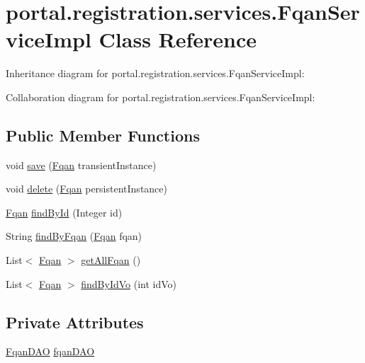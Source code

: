 \hypertarget{classportal_1_1registration_1_1services_1_1FqanServiceImpl}{
\section{portal.registration.services.FqanServiceImpl Class Reference}
\label{classportal_1_1registration_1_1services_1_1FqanServiceImpl}
}


Inheritance diagram for portal.registration.services.FqanServiceImpl:


Collaboration diagram for portal.registration.services.FqanServiceImpl:
\subsection*{Public Member Functions}
\begin{DoxyCompactItemize}
\item 
void \hyperlink{classportal_1_1registration_1_1services_1_1FqanServiceImpl_aa664ef0629c5e47dcb92136ecee98a83}{save} (\hyperlink{classportal_1_1registration_1_1domain_1_1Fqan}{Fqan} transientInstance)
\item 
void \hyperlink{classportal_1_1registration_1_1services_1_1FqanServiceImpl_a455a630259e41689cd64eb3e7d7eaaed}{delete} (\hyperlink{classportal_1_1registration_1_1domain_1_1Fqan}{Fqan} persistentInstance)
\item 
\hyperlink{classportal_1_1registration_1_1domain_1_1Fqan}{Fqan} \hyperlink{classportal_1_1registration_1_1services_1_1FqanServiceImpl_a148941aec6f375b090347c890dbf2c85}{findById} (Integer id)
\item 
String \hyperlink{classportal_1_1registration_1_1services_1_1FqanServiceImpl_a6c43b5b8e616412c1f6d3080922ab9eb}{findByFqan} (\hyperlink{classportal_1_1registration_1_1domain_1_1Fqan}{Fqan} fqan)
\item 
List$<$ \hyperlink{classportal_1_1registration_1_1domain_1_1Fqan}{Fqan} $>$ \hyperlink{classportal_1_1registration_1_1services_1_1FqanServiceImpl_afec97151c0eedda16e0874293761211b}{getAllFqan} ()
\item 
List$<$ \hyperlink{classportal_1_1registration_1_1domain_1_1Fqan}{Fqan} $>$ \hyperlink{classportal_1_1registration_1_1services_1_1FqanServiceImpl_a8dc7b93d3f2b0e59f247a01ce92e3828}{findByIdVo} (int idVo)
\end{DoxyCompactItemize}
\subsection*{Private Attributes}
\begin{DoxyCompactItemize}
\item 
\hyperlink{interfaceportal_1_1registration_1_1dao_1_1FqanDAO}{FqanDAO} \hyperlink{classportal_1_1registration_1_1services_1_1FqanServiceImpl_a706d0ee1a92e2135bfd7b91915a9c28d}{fqanDAO}
\end{DoxyCompactItemize}
